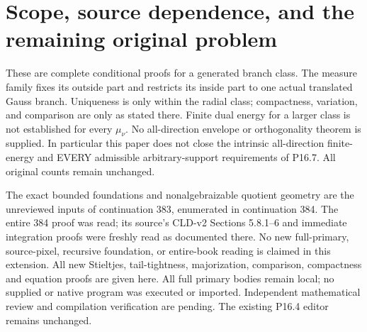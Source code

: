 \documentclass[11pt]{article}
\begin{document}
\section{Scope, source dependence, and the remaining original problem}
These are complete conditional proofs for a generated branch class.
The measure family fixes its outside part and restricts its inside part
to one actual translated Gauss branch. Uniqueness is only within the
radial class; compactness, variation, and comparison are only as stated
there. Finite dual energy for a larger class is not established for every
$\mu_\nu$. No all-direction envelope or orthogonality theorem is supplied.
In particular this paper does not close the intrinsic all-direction
finite-energy and EVERY admissible arbitrary-support requirements of
P16.7. All original counts remain unchanged.

The exact bounded foundations and nonalgebraizable quotient geometry
are the unreviewed inputs of continuation 383, enumerated in continuation
384. The entire 384 proof was read; its source's CLD-v2 Sections 5.8.1--6
and immediate integration proofs were freshly read as documented there.
No new full-primary, source-pixel, recursive foundation, or entire-book
reading is claimed in this extension. All new Stieltjes, tail-tightness,
majorization, comparison, compactness and equation proofs are given here.
All full primary bodies remain local; no supplied or native program was
executed or imported. Independent mathematical review and compilation
verification are pending. The existing P16.4 editor remains unchanged.
\end{document}
